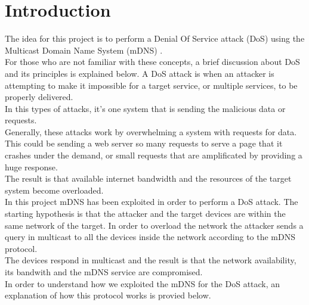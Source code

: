 \documentclass[fleqn, 10pt]{SelfArx} %
\affiliation{\textsuperscript{1}\textit{Department of Computer Engineering, University of Pavia, Pavia, Italy}} %
\affiliation{\textsuperscript{2}\textit{Enterprise Digital Infrastructure}} %
\affiliation{\textbf{Corresponding author}: francesco.amato01@universitadipavia.it} %
\begin{document}
\maketitle %

\tableofcontents %

\thispagestyle{empty} %


\section*{Introduction} %


The idea for this project is to perform a Denial Of Service attack (DoS) \cite{DDoS} using the Multicast Domain Name System (mDNS) \cite{rfc6762}.\\
For those who are not familiar with these concepts, a brief discussion about DoS and its principles is explained below.
A DoS attack is when an attacker is attempting to make it impossible for a target service, or multiple services, to be properly delivered.\\
In this types of attacks, it’s one system that is sending the malicious data or requests.\\
Generally, these attacks work by overwhelming a system with requests for data. This could be sending a web server so many requests to serve a page that it crashes under the demand, or small requests that are amplificated by providing a huge response. \\ The result is that available internet bandwidth and the resources of the target system become overloaded.\\
In this project mDNS has been exploited in order to perform a DoS attack. The starting hypothesis is that the attacker and the target devices are within the same network of the target. In order to overload the network the attacker sends a query in multicast to all the devices inside the network according to the mDNS protocol. \\ The devices respond in multicast and the result is that the network availability, its bandwith and the mDNS service are compromised. \\
In order to understand how we exploited the mDNS for the DoS attack, an explanation of how this protocol works is provied below.
\end{document}
